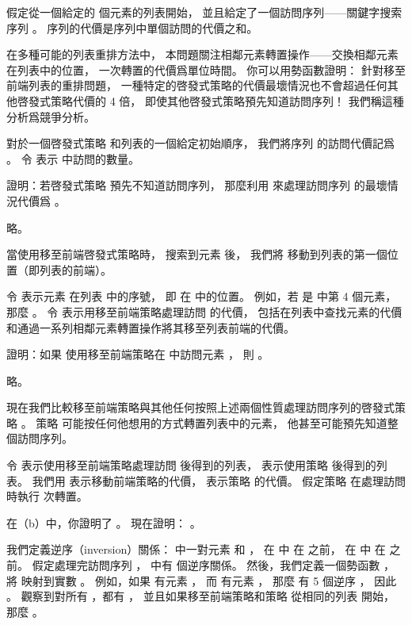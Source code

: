 假定從一個給定的  個元素的列表開始，
並且給定了一個訪問序列——關鍵字搜索序列 。
序列的代價是序列中單個訪問的代價之和。

在多種可能的列表重排方法中，
本問題關注相鄰元素轉置操作——交換相鄰元素在列表中的位置，
一次轉置的代價爲單位時間。
你可以用勢函數證明：
針對移至前端列表的重排問題，
一種特定的啓發式策略的代價最壞情況也不會超過任何其他啓發式策略代價的 4 倍，
即使其他啓發式策略預先知道訪問序列！
我們稱這種分析爲{\EMP 競爭分析}。

對於一個啓發式策略  和列表的一個給定初始順序，
我們將序列 \m{\sigma} 的訪問代價記爲 。
令  表示 \m{\sigma} 中訪問的數量。

\startigBase[a]\startitem
證明：若啓發式策略  預先不知道訪問序列，
那麼利用  來處理訪問序列 \m{\sigma} 的最壞情況代價爲 。
\stopitem\stopigBase

\startANSWER
略。
\stopANSWER

當使用{\EMP 移至前端}啓發式策略時，
搜索到元素  後，
我們將  移動到列表的第一個位置（即列表的前端）。

令 表示元素  在列表  中的序號，
即  在  中的位置。
例如，若  是  中第 4 個元素，
那麼 。
令  表示用移至前端策略處理訪問  的代價，
包括在列表中查找元素的代價和通過一系列相鄰元素轉置操作將其移至列表前端的代價。

\startigBase[continue]\startitem
證明：如果  使用移至前端策略在  中訪問元素 ，
則 。
\stopitem\stopigBase

\startANSWER
略。
\stopANSWER

現在我們比較移至前端策略與其他任何按照上述兩個性質處理訪問序列的啓發式策略 。
策略  可能按任何他想用的方式轉置列表中的元素，
他甚至可能預先知道整個訪問序列。

令  表示使用移至前端策略處理訪問  後得到的列表，
  表示使用策略  後得到的列表。
我們用  表示移動前端策略的代價，  表示策略  的代價。
假定策略  在處理訪問  時執行  次轉置。

\startigBase[continue]\startitem
在（b）中，你證明了 。
現在證明： 。
\stopitem\stopigBase

\startANSWER
\stopANSWER

我們定義{\EMP 逆序}（inversion）關係：
  中一對元素  和 ，
在  中  在  之前，
在  中  在  之前。
假定處理完訪問序列 ，
  中有  個逆序關係。
然後，我們定義一個勢函數 \m{\Phi}，
將  映射到實數 。
例如，如果  有元素 ，
而  有元素 ，
那麼  有 5 個逆序 ，
因此 。
觀察到對所有 ，都有 ，
並且如果移至前端策略和策略  從相同的列表  開始，
那麼 。

